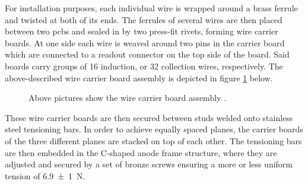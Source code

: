 For installation purposes, each individual wire is wrapped around a brass ferrule and twisted at both of its ends. The ferrules of several wires are then placed between two \glspl{pcb} and sealed in by two press-fit rivets, forming wire carrier boards. At one side each wire is weaved around two pins in the carrier board which are connected to a readout connector on the top side of the board. Said boards carry groups of 16 induction, or 32 collection wires, respectively. The above-described wire carrier board assembly is depicted in figure \ref{fig:WireCarrier} below.
\begin{figure}[htbp]
    \centering
    \caption[MicroBooNE's Readout Wire Carrier]{Above pictures show the wire carrier board assembly \cite{MicroBooNEDetector}.}
    \label{fig:WireCarrier}
\end{figure}
These wire carrier boards are then secured between studs welded onto stainless steel tensioning bars. In order to achieve equally spaced planes, the carrier boards of the three different planes are stacked on top of each other. The tensioning bars are then embedded in the C-shaped anode frame structure, where they are adjusted and secured by a set of bronze screws ensuring a more or less uniform tension of \SI{6.9(10)}{\newton}.

